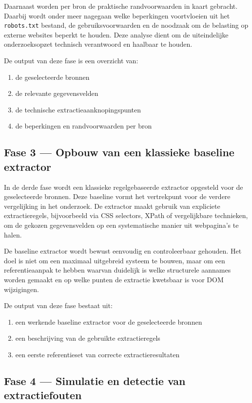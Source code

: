 Daarnaast worden per bron de praktische randvoorwaarden in kaart gebracht. Daarbij wordt onder meer nagegaan welke beperkingen voortvloeien uit het \texttt{robots.txt} bestand, de gebruiksvoorwaarden en de noodzaak om de belasting op externe websites beperkt te houden. Deze analyse dient om de uiteindelijke onderzoeksopzet technisch verantwoord en haalbaar te houden.

De output van deze fase is een overzicht van:
\begin{enumerate}
    \item de geselecteerde bronnen
    \item de relevante gegevensvelden
    \item de technische extractieaanknopingspunten
    \item de beperkingen en randvoorwaarden per bron
\end{enumerate}

\subsection{Fase 3 --- Opbouw van een klassieke baseline extractor}
\label{subsec:meth-fase3}

In de derde fase wordt een klassieke regelgebaseerde extractor opgesteld voor de geselecteerde bronnen. Deze baseline vormt het vertrekpunt voor de verdere vergelijking in het onderzoek. De extractor maakt gebruik van expliciete extractieregels, bijvoorbeeld via CSS selectors, XPath of vergelijkbare technieken, om de gekozen gegevensvelden op een systematische manier uit webpagina's te halen.

De baseline extractor wordt bewust eenvoudig en controleerbaar gehouden. Het doel is niet om een maximaal uitgebreid systeem te bouwen, maar om een referentieaanpak te hebben waarvan duidelijk is welke structurele aannames worden gemaakt en op welke punten de extractie kwetsbaar is voor DOM wijzigingen.

De output van deze fase bestaat uit:
\begin{enumerate}
    \item een werkende baseline extractor voor de geselecteerde bronnen
    \item een beschrijving van de gebruikte extractieregels
    \item een eerste referentieset van correcte extractieresultaten
\end{enumerate}

\subsection{Fase 4 --- Simulatie en detectie van extractiefouten}
\label{subsec:meth-fase4}

